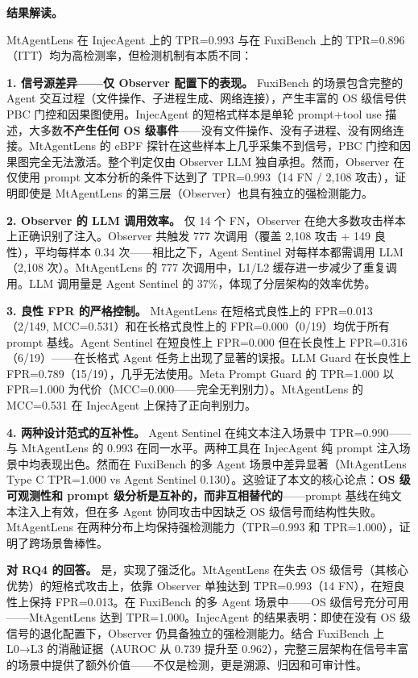 \documentclass[a4paper]{ctexart}
\makeatletter
\renewcommand{\_}{%
  \ifmmode
    \nfss@text{\textunderscore}%
  \else
    \textunderscore\discretionary{}{}{}%
  \fi}
\makeatother
\begin{document}
\textbf{结果解读。}


MtAgentLens 在 InjecAgent 上的 TPR=0.993 与在 FuxiBench 上的 TPR=0.896（ITT）均为高检测率，但检测机制有本质不同：


\textbf{1. 信号源差异——仅 Observer 配置下的表现。} FuxiBench 的场景包含完整的 Agent 交互过程（文件操作、子进程生成、网络连接），产生丰富的 OS 级信号供 PBC 门控和因果图使用。InjecAgent 的短格式样本是单轮 prompt+tool\_use 描述，大多数\textbf{不产生任何 OS 级事件}——没有文件操作、没有子进程、没有网络连接。MtAgentLens 的 eBPF 探针在这些样本上几乎采集不到信号，PBC 门控和因果图完全无法激活。整个判定仅由 Observer LLM 独自承担。然而，Observer 在仅使用 prompt 文本分析的条件下达到了 TPR=0.993（14 FN / 2,108 攻击），证明即使是 MtAgentLens 的第三层（Observer）也具有独立的强检测能力。


\textbf{2. Observer 的 LLM 调用效率。} 仅 14 个 FN，Observer 在绝大多数攻击样本上正确识别了注入。Observer 共触发 777 次调用（覆盖 2,108 攻击 + 149 良性），平均每样本 0.34 次——相比之下，Agent Sentinel 对每样本都需调用 LLM（2,108 次）。MtAgentLens 的 777 次调用中，L1/L2 缓存进一步减少了重复调用。LLM 调用量是 Agent Sentinel 的 37\%，体现了分层架构的效率优势。


\textbf{3. 良性 FPR 的严格控制。} MtAgentLens 在短格式良性上的 FPR=0.013（2/149, MCC=0.531）和在长格式良性上的 FPR=0.000（0/19）均优于所有 prompt 基线。Agent Sentinel 在短良性上 FPR=0.000 但在长良性上 FPR=0.316（6/19）——在长格式 Agent 任务上出现了显著的误报。LLM Guard 在长良性上 FPR=0.789（15/19），几乎无法使用。Meta Prompt Guard 的 TPR=1.000 以 FPR=1.000 为代价（MCC=0.000——完全无判别力）。MtAgentLens 的 MCC=0.531 在 InjecAgent 上保持了正向判别力。


\textbf{4. 两种设计范式的互补性。} Agent Sentinel 在纯文本注入场景中 TPR=0.990——与 MtAgentLens 的 0.993 在同一水平。两种工具在 InjecAgent 纯 prompt 注入场景中均表现出色。然而在 FuxiBench 的多 Agent 场景中差异显著（MtAgentLens Type C TPR=1.000 vs Agent Sentinel 0.130）。这验证了本文的核心论点：\textbf{OS 级可观测性和 prompt 级分析是互补的，而非互相替代的}——prompt 基线在纯文本注入上有效，但在多 Agent 协同攻击中因缺乏 OS 级信号而结构性失败。MtAgentLens 在两种分布上均保持强检测能力（TPR=0.993 和 TPR=1.000），证明了跨场景鲁棒性。


\textbf{对 RQ4 的回答。} 是，实现了强泛化。MtAgentLens 在失去 OS 级信号（其核心优势）的短格式攻击上，依靠 Observer 单独达到 TPR=0.993（14 FN），在短良性上保持 FPR=0.013。在 FuxiBench 的多 Agent 场景中——OS 级信号充分可用——MtAgentLens 达到 TPR=1.000。InjecAgent 的结果表明：即使在没有 OS 级信号的退化配置下，Observer 仍具备独立的强检测能力。结合 FuxiBench 上 L0→L3 的消融证据（AUROC 从 0.739 提升至 0.962），完整三层架构在信号丰富的场景中提供了额外价值——不仅是检测，更是溯源、归因和可审计性。
\end{document}
